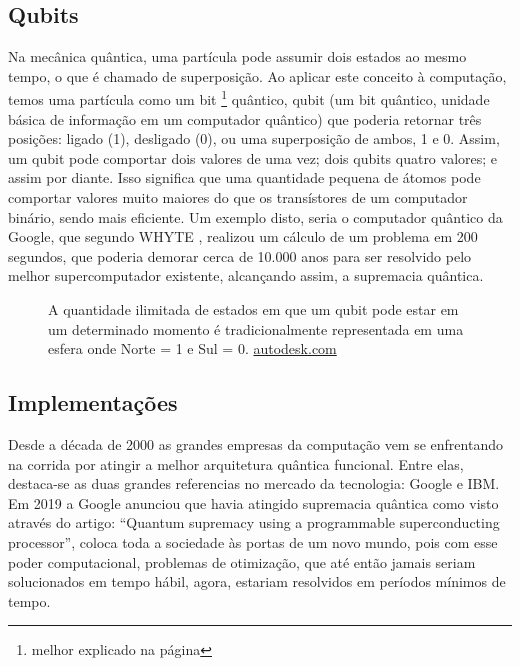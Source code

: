 \subsection{Qubits}
\label{qubits}
Na mecânica quântica, uma partícula pode assumir dois estados ao mesmo tempo, o que é chamado de superposição. Ao aplicar este conceito à computação, temos uma partícula como um bit \footnote{melhor explicado na página \pageref{bits}} quântico, qubit (um bit quântico, unidade básica de informação em um computador quântico) que poderia retornar três posições: ligado (1), desligado (0), ou uma superposição de ambos, 1 e 0. Assim, um qubit pode comportar dois valores de uma vez; dois qubits quatro valores; e assim por diante. Isso significa que uma quantidade pequena de átomos pode comportar valores muito maiores do que os transístores de um computador binário, sendo mais eficiente. Um exemplo disto, seria o computador quântico da Google, que segundo WHYTE \cite{20}, realizou um cálculo de um problema em 200 segundos, que poderia demorar cerca de 10.000 anos para ser resolvido pelo melhor supercomputador existente, alcançando assim, a supremacia quântica.

\vspace{1cm}
\begin{figure}[H] \centering 
  \caption{\label{bit_vs_qubit} A quantidade ilimitada de estados em que um qubit pode estar em um determinado momento é tradicionalmente representada em uma esfera onde Norte = 1 e Sul = 0. \href{https://www.autodesk.com}{autodesk.com}} 
\end{figure}

\subsection{Implementações}
Desde a década de 2000 as grandes empresas da computação vem se enfrentando na corrida por atingir a melhor arquitetura quântica funcional. Entre elas, destaca-se as duas grandes referencias no mercado da tecnologia: Google e IBM. Em 2019 a Google anunciou que havia atingido supremacia quântica como visto através do artigo: ``Quantum supremacy using a programmable superconducting processor'', \cite{17} coloca toda a sociedade às portas de um novo mundo, pois com esse poder computacional, problemas de otimização, que até então jamais seriam solucionados em tempo hábil, agora, estariam resolvidos em períodos mínimos de tempo.

